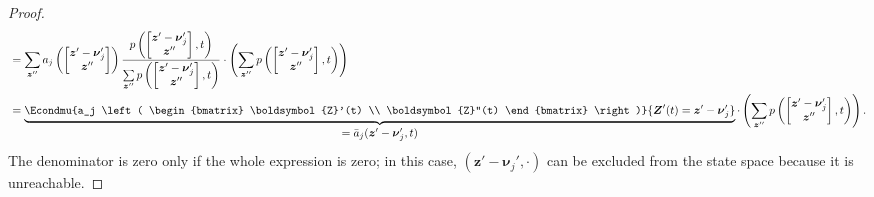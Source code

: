 \begin{proof}
\begin{align*}
        &= \sum\limits_{{\boldsymbol{z}}'' } a_j \left( \begin{bmatrix} \boldsymbol{z}' - \boldsymbol{\nu}_j' \\ {\boldsymbol{z}}'' \end{bmatrix} \right)  \frac{ p \left( \begin{bmatrix} \boldsymbol{z}' - \boldsymbol{\nu}_j' \\ {\boldsymbol{z}}'' \end{bmatrix}, t \right) }{ \sum\limits_{{\boldsymbol{z}}'' } p \left( \begin{bmatrix}\boldsymbol{z}' - \boldsymbol{\nu}_j' \\ {\boldsymbol{z}}'' \end{bmatrix}, t \right)} \cdot \left( \sum_{{\boldsymbol{z}}'' } p \left( \begin{bmatrix} \boldsymbol{z}' - \boldsymbol{\nu}_j' \\ {\boldsymbol{z}}'' \end{bmatrix}, t \right)  \right) \\
        &=  \underbrace{ \Econdmu{a_j \left( \begin{bmatrix} \boldsymbol{Z}'(t) \\ \boldsymbol{Z}''(t) \end{bmatrix} \right)}{\boldsymbol{Z}'(t) = \boldsymbol{z}' - \boldsymbol{\nu}_j' } }_{\textstyle = \bar{a}_j (\boldsymbol{z}' - \boldsymbol{\nu}_j', t)} \cdot \left( \sum_{{\boldsymbol{z}}'' } p \left( \begin{bmatrix} \boldsymbol{z}' - \boldsymbol{\nu}_j' \\ {\boldsymbol{z}}'' \end{bmatrix}, t \right) \right).
    \end{align*}
    The denominator is zero only if the whole expression is zero; in this case, $(\boldsymbol{z}'-\boldsymbol{\nu}_j', \cdot)$ can be excluded from the state space because it is unreachable.
    

\end{proof}
